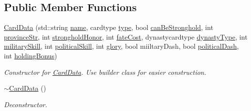 \subsection*{Public Member Functions}
\begin{DoxyCompactItemize}
\item 
\mbox{\label{classl5r_1_1CardData_a8342474dadce247a5dab9f1578e4b881}} 
\hyperlink{classl5r_1_1CardData_a8342474dadce247a5dab9f1578e4b881}{Card\+Data} (std\+::string \hyperlink{classl5r_1_1CardData_a9e8a18b7c9b76ee2f7905b31ef1540ba}{name}, cardtype \hyperlink{classl5r_1_1CardData_ab1748a0a994053730820d9640a4c43aa}{type}, bool \hyperlink{classl5r_1_1CardData_a585e82d9822af147aff17cab13504e5b}{can\+Be\+Stronghold}, int \hyperlink{classl5r_1_1CardData_a33022ed5921a030677b81532331d4cf2}{province\+Str}, int \hyperlink{classl5r_1_1CardData_aec89444713e22a3efeabbb0dd08772ac}{stronghold\+Honor}, int \hyperlink{classl5r_1_1CardData_a7777e76c6ba17fc434fe2f283782fe4d}{fate\+Cost}, dynastycardtype \hyperlink{classl5r_1_1CardData_a5d95dc6177afae1bbcbbbf982b991e6d}{dynasty\+Type}, int \hyperlink{classl5r_1_1CardData_ab188c6df282db387cf9476163d363042}{military\+Skill}, int \hyperlink{classl5r_1_1CardData_ac6febeb982d3779abd6a2dafff5a3acf}{political\+Skill}, int \hyperlink{classl5r_1_1CardData_ac6f52dd080b87cf3093c91e2dac5c219}{glory}, bool miiltary\+Dash, bool \hyperlink{classl5r_1_1CardData_a1d72ff395b8bde655e94f30219d465a5}{political\+Dash}, int \hyperlink{classl5r_1_1CardData_a4dfdeaeddd5b067959f2f1c971e0cfad}{holding\+Bonus})
\begin{DoxyCompactList}\small\item\em Constructor for \hyperlink{classl5r_1_1CardData}{Card\+Data}. Use builder class for easier construction. \end{DoxyCompactList}\item 
\mbox{\label{classl5r_1_1CardData_aadfd0b5a68e50a0cf619ac9c821830e9}} 
\hyperlink{classl5r_1_1CardData_aadfd0b5a68e50a0cf619ac9c821830e9}{$\sim$\+Card\+Data} ()
\begin{DoxyCompactList}\small\item\em Deconstructor. \end{DoxyCompactList}\end{DoxyCompactItemize}
